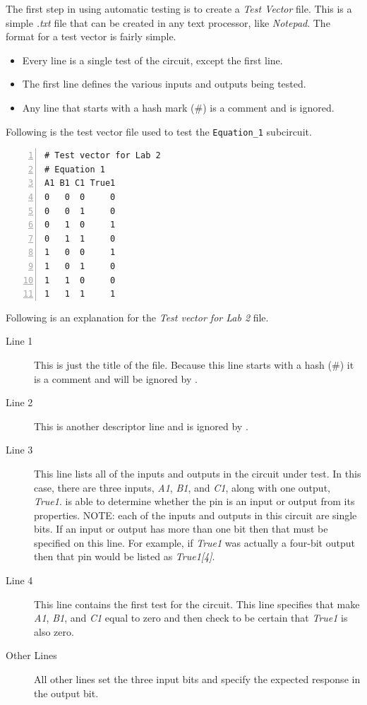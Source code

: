 The first step in using automatic testing is to create a \textit{Test Vector} file. This is a simple \textit{.txt} file that can be created in any text processor, like \textit{Notepad}.  The format for a test vector is fairly simple.

\begin{itemize}
	\item Every line is a single test of the circuit, except the first line.
	\item The first line defines the various inputs and outputs being tested.
	\item Any line that starts with a hash mark (\#) is a comment and is ignored.
\end{itemize}

Following is the test vector file used to test the \lstinline[columns=fixed]|Equation_1| subcircuit.

\begin{Verbatim}[frame=lines,
								 numbers=left,
								 xleftmargin=10mm,
								 xrightmargin=10mm]
# Test vector for Lab 2
# Equation 1
A1 B1 C1 True1
0   0  0     0
0   0  1     0
0   1  0     1
0   1  1     0
1   0  0     1
1   0  1     0
1   1  0     0
1   1  1     1
\end{Verbatim}

Following is an explanation for the \textit{Test vector for Lab 2} file.

\begin{description}
	\item[Line 1] This is just the title of the file. Because this line starts with a hash (\#) it is a comment and will be ignored by \LE.
	\item[Line 2] This is another descriptor line and is ignored by \LE.
	\item[Line 3] This line lists all of the inputs and outputs in the circuit under test. In this case, there are three inputs, \textit{A1}, \textit{B1}, and \textit{C1}, along with one output, \textit{True1}. \LE is able to determine whether the pin is an input or output from its properties. NOTE: each of the inputs and outputs in this circuit are single bits. If an input or output has more than one bit then that must be specified on this line. For example, if \textit{True1} was actually a four-bit output then that pin would be listed as \textit{True1[4]}.
	\item[Line 4] This line contains the first test for the circuit. This line specifies that \LE make \textit{A1}, \textit{B1}, and \textit{C1} equal to zero and then check to be certain that \textit{True1} is also zero.
	\item[Other Lines] All other lines set the three input bits and specify the expected response in the output bit.
\end{description}

